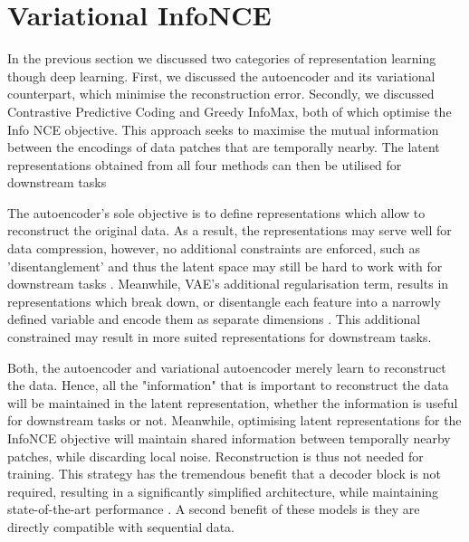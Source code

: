 \chapter{Variational InfoNCE}


	In the previous section we discussed two categories of representation learning though deep learning. First, we discussed the autoencoder and its variational counterpart, which minimise the reconstruction error. Secondly, we discussed Contrastive Predictive Coding and Greedy InfoMax, both of which optimise the Info NCE objective. This approach seeks to maximise the mutual information between the encodings of data patches that are temporally nearby. The latent representations obtained from all four methods can then be utilised for downstream tasks \cite{bengioRepresentationLearningReview2013, weiRecentAdvancesVariational2021, oordRepresentationLearningContrastive2019, lowePuttingEndEndtoEnd2020}
	
		The autoencoder's sole objective is to define representations which allow to reconstruct the original data. As a result, the representations may serve well for data compression, however, no additional constraints are enforced, such as 'disentanglement' and thus the latent space may still be hard to work with for downstream tasks \cite{tschannenRecentAdvancesAutoencoderBased2018}. Meanwhile, VAE's additional regularisation term, results in representations which break down, or disentangle each feature into a narrowly defined variable and encode them as separate dimensions \cite{weiRecentAdvancesVariational2021}. This additional constrained may result in more suited representations for downstream tasks. %

		Both, the autoencoder and variational autoencoder merely learn to reconstruct the data. Hence, all the "information" that is important to reconstruct the data will be maintained in the latent representation, whether the information is useful for downstream tasks or not. Meanwhile, optimising latent representations for the InfoNCE objective will maintain shared information between temporally nearby patches, while discarding local noise. Reconstruction is thus not needed for training. This strategy has the tremendous benefit that a decoder block is not required, resulting in a significantly simplified architecture, while maintaining state-of-the-art performance \cite{stackeEvaluationContrastivePredictive2020}. A second benefit of these models is they are directly compatible with sequential data.
		
